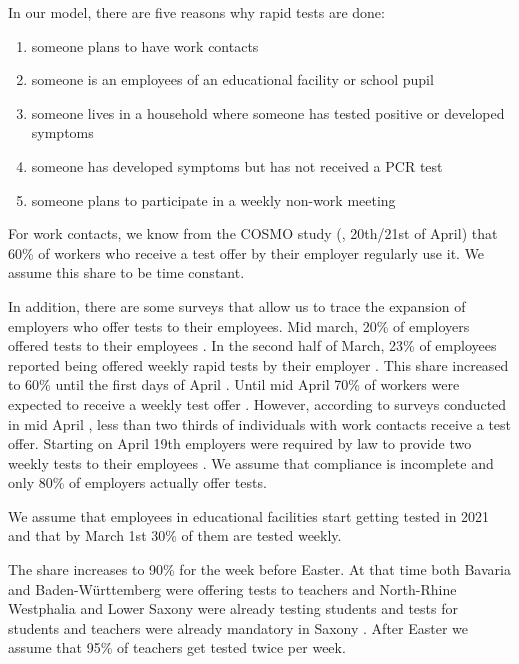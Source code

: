 In our model, there are five reasons why rapid tests are done:
\begin{enumerate}
    \item someone plans to have work contacts
    \item someone is an employees of an educational facility or school pupil
    \item someone lives in a household where someone has tested positive or developed
          symptoms
    \item someone has developed symptoms but has not received a PCR test
    \item someone plans to participate in a weekly non-work meeting
\end{enumerate}


For work contacts, we know from the COSMO study (\cite{Betsch2021}, 20th/21st of April)
that 60\% of workers who receive a test offer by their employer regularly use it. We
assume this share to be time constant.

In addition, there are some surveys that allow us to trace the expansion of employers who
offer tests to their employees. Mid march, 20\% of employers offered tests to their
employees \citep{DIHK2021}. In the second half of March, 23\% of employees reported being
offered weekly rapid tests by their employer \citep{Ahlers2021}. This share increased to
60\% until the first days of April \cite{ZDF2021}. Until mid April 70\% of workers were
expected to receive a weekly test offer \citep{AerzteZeitung2021}. However, according to
surveys conducted in mid April \citep{Betsch2021}, less than two thirds of individuals
with work contacts receive a test offer. Starting on April 19th employers were required
by law to provide two weekly tests to their employees \citep{Bundesanzeiger2021}. We
assume that compliance is incomplete and only 80\% of employers actually offer
tests.


We assume that employees in educational facilities start getting tested in 2021 and that
by March 1st 30\% of them are tested weekly.

The share increases to 90\% for the week before Easter. At that time both Bavaria
\citep{BayrischerRundfunk2021} and Baden-Württemberg \citep{MinisteriumKultus2021} were
offering tests to teachers and North-Rhine Westphalia \cite{DPA2021} and Lower Saxony
\citep{SueddeutscheZeitung2021} were already testing students and tests for students and
teachers were already mandatory in Saxony \citep{SueddeutscheZeitung2021a}. After Easter
we assume that 95\% of teachers get tested twice per week.


